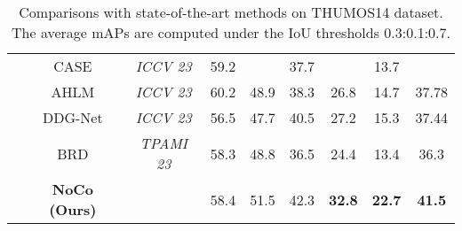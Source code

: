 \begin{table*}[htb]
{\begin{tabular}{c|cccccccc}
& CASE& \textit{ICCV 23}& 59.2&& 37.7&& 13.7&\\
& AHLM& \textit{ICCV 23}& 60.2& 48.9& 38.3& 26.8& 14.7& 37.78 \\
& DDG-Net& \textit{ICCV 23}& 56.5& 47.7& 40.5& 27.2& 15.3& 37.44 \\ 
& BRD& \textit{TPAMI 23}& 58.3& 48.8& 36.5& 24.4& 13.4& 36.3 \\
\cline{2-9} 
& \textbf{NoCo (Ours)}&& 58.4& 51.5& 42.3& \textbf{32.8}& \textbf{22.7}& \textbf{41.5} \\
 \hline
\end{tabular}
}
\caption{Comparisons with state-of-the-art methods on THUMOS14 dataset. The average mAPs are computed under the IoU thresholds 0.3:0.1:0.7.}
\label{baseline-on THUMOS14}
\end{table*}
\fi


